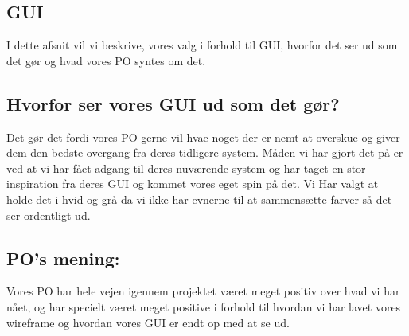\subsection{GUI}
I dette afsnit vil vi beskrive, vores valg i forhold til GUI, hvorfor det ser ud som det gør og hvad vores PO syntes om det.

\subsection{Hvorfor ser vores GUI ud som det gør?}
Det gør det fordi vores PO gerne vil hvae noget der er nemt at overskue og giver dem den bedste overgang fra deres tidligere system. Måden vi har gjort det på er ved at vi har fået adgang til deres nuværende system og har taget en stor inspiration fra deres GUI og kommet vores eget spin på det. Vi Har valgt at holde det i hvid og grå da vi ikke har evnerne til at sammensætte farver så det ser ordentligt ud. 

\subsection{PO's mening:}
Vores PO har hele vejen igennem projektet været meget positiv over hvad vi har nået, og har specielt været meget positive i forhold til hvordan vi har lavet vores wireframe og hvordan vores GUI er endt op med at se ud.